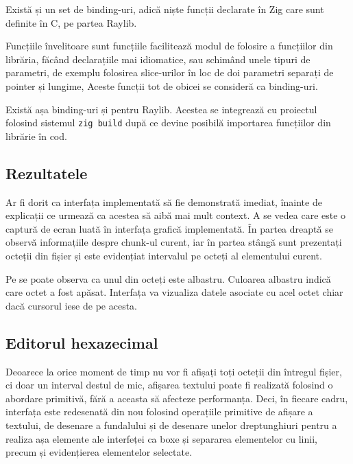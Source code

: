 \documentclass[a4paper,12pt]{report}
\begin{document}
Există și un set de binding-uri, adică niște funcții declarate în Zig care sunt definite în C, pe partea Raylib.

Funcțiile învelitoare sunt funcțiile facilitează modul de folosire a funcțiilor din librăria,
făcând declarațiile mai idiomatice, sau schimând unele tipuri de parametri,
de exemplu folosirea slice-urilor în loc de doi parametri separați de pointer și lungime,
Aceste funcții tot de obicei se consideră ca binding-uri.

Există așa binding-uri și pentru Raylib\cite{raylib_zig}.
Acestea se integrează cu proiectul folosind sistemul \texttt{zig build}
după ce devine posibilă importarea funcțiilor din librărie în cod.

\subsection{Rezultatele}

Ar fi dorit ca interfața implementată să fie demonstrată imediat,
înainte de explicații ce urmează ca acestea să aibă mai mult context.
A se vedea  care este o captură de ecran luată în interfața grafică implementată.
În partea dreaptă se observă informațiile despre chunk-ul curent,
iar în partea stângă sunt prezentați octeții din fișier
și este evidențiat intervalul pe octeți al elementului curent.


Pe  se poate observa ca unul din octeți este albastru.
Culoarea albastru indică care octet a fost apăsat.
Interfața va vizualiza datele asociate cu acel octet chiar dacă cursorul iese de pe acesta.


\subsection{Editorul hexazecimal}

Deoarece la orice moment de timp nu vor fi afișați toți octeții din întregul fișier,
ci doar un interval destul de mic, afișarea textului poate fi realizată folosind o abordare primitivă,
fără a aceasta să afecteze performanța.
Deci, în fiecare cadru, interfața este redesenată din nou folosind operațiile primitive
de afișare a textului, de desenare a fundalului și de desenare unelor dreptunghiuri
pentru a realiza așa elemente ale interfeței ca boxe și separarea elementelor cu linii,
precum și evidențierea elementelor selectate.
\end{document}
